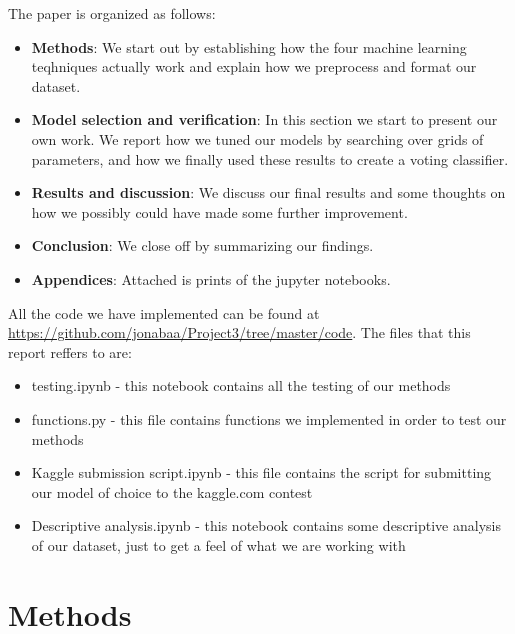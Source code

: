 \documentclass[parskip=half]{scrartcl}
\theoremstyle{definition}
\theoremstyle{remark}
\begin{document}
The paper is organized as follows: 
\begin{itemize}
    \item
        \textbf{Methods}: 
        We start out by establishing how the four machine learning 
        teqhniques actually work and explain how we preprocess and
        format our dataset.
    \item
        \textbf{Model selection and verification}:
        In this section we start to present our own work.
        We report how we tuned our models by searching
        over grids of parameters, and how
        we finally used these results to create a voting classifier.
    \item
        \textbf{Results and discussion}:
        We discuss our final results and some thoughts on how we possibly
        could have made some further improvement.
    \item
        \textbf{Conclusion}:
        We close off by summarizing our findings.
    \item
        \textbf{Appendices}:
        Attached is prints of the jupyter notebooks. 
\end{itemize}

\begin{framed}
All the code we have implemented can be found at \url{https://github.com/jonabaa/Project3/tree/master/code}. The files that this report reffers to
are:
    \begin{itemize}
        \item
            testing.ipynb - this notebook 
            contains all the testing of our methods
        \item
            functions.py - this file contains functions we implemented in
            order to test our methods
        \item
            Kaggle submission script.ipynb - this file contains the script
            for submitting our model of choice to the kaggle.com contest
        \item
            Descriptive analysis.ipynb - this notebook contains some 
            descriptive analysis of our dataset, just to get a feel of
            what we are working with
    \end{itemize}
\end{framed}

\section{Methods} \label{sec:methods}
\end{document}
